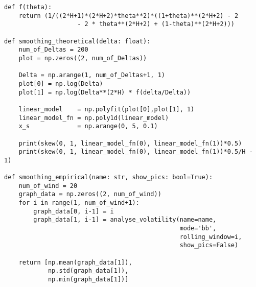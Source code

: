 \begin{verbatim}
def f(theta):
    return (1/((2*H+1)*(2*H+2)*theta**2)*((1+theta)**(2*H+2) - 2 
                    - 2 * theta**(2*H+2) + (1-theta)**(2*H+2)))    

def smoothing_theoretical(delta: float):
    num_of_Deltas = 200
    plot = np.zeros((2, num_of_Deltas))

    Delta = np.arange(1, num_of_Deltas+1, 1)
    plot[0] = np.log(Delta)
    plot[1] = np.log(Delta**(2*H) * f(delta/Delta))

    linear_model    = np.polyfit(plot[0],plot[1], 1)
    linear_model_fn = np.poly1d(linear_model)
    x_s             = np.arange(0, 5, 0.1)

    print(skew(0, 1, linear_model_fn(0), linear_model_fn(1))*0.5)
    print(skew(0, 1, linear_model_fn(0), linear_model_fn(1))*0.5/H - 1)

def smoothing_empirical(name: str, show_pics: bool=True):
    num_of_wind = 20
    graph_data = np.zeros((2, num_of_wind))
    for i in range(1, num_of_wind+1):
        graph_data[0, i-1] = i
        graph_data[1, i-1] = analyse_volatility(name=name, 
                                                mode='bb', 
                                                rolling_window=i, 
                                                show_pics=False)  

    return [np.mean(graph_data[1]), 
            np.std(graph_data[1]), 
            np.min(graph_data[1])]
\end{verbatim}